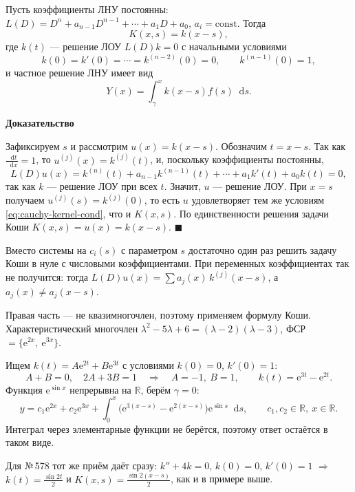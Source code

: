 \documentclass[12pt,a4paper]{article}
\numberwithin{equation}{section}
\newcommand{\R}{\mathbb{R}}
\newcommand{\e}{\mathrm{e}}
\newcommand{\dd}{\mathop{}\!\mathrm{d}}
\renewenvironment{proof}[1][Доказательство]{\begin{center}\textbf{#1}\end{center}}{\hfill$\blacksquare$\par}
\begin{document}
\begin{theoremHSE}
Пусть коэффициенты ЛНУ постоянны: \(L(D)=D^n+a_{n-1}D^{n-1}+\cdots+a_1D+a_0\), \(a_i=\mathrm{const}\). Тогда
\[
K(x,s)=k(x-s),
\]
где \(k(t)\) --- решение ЛОУ \(L(D)k=0\) с начальными условиями
\[
k(0)=k'(0)=\cdots=k^{(n-2)}(0)=0,\qquad k^{(n-1)}(0)=1,
\]
и частное решение ЛНУ имеет вид
\[
Y(x)=\int_\gamma^x k(x-s)f(s)\dd s.
\]
\end{theoremHSE}

\begin{proof}
Зафиксируем \(s\) и рассмотрим \(u(x)=k(x-s)\). Обозначим \(t=x-s\). Так как \(\frac{\dd t}{\dd x}=1\), то \(u^{(j)}(x)=k^{(j)}(t)\), и, поскольку коэффициенты постоянны,
\[
L(D)u(x)=k^{(n)}(t)+a_{n-1}k^{(n-1)}(t)+\cdots+a_1k'(t)+a_0k(t)=0,
\]
так как \(k\) --- решение ЛОУ при всех \(t\). Значит, \(u\) --- решение ЛОУ. При \(x=s\) получаем \(u^{(j)}(s)=k^{(j)}(0)\), то есть \(u\) удовлетворяет тем же условиям \eqref{eq:cauchy-kernel-cond}, что и \(K(x,s)\). По единственности решения задачи Коши \(K(x,s)=u(x)=k(x-s)\).
\end{proof}

\begin{remarkHSE}
Вместо системы на \(c_i(s)\) с параметром \(s\) достаточно один раз решить задачу Коши в нуле с числовыми коэффициентами. При переменных коэффициентах так не получится: тогда \(L(D)u(x)=\sum a_j(x)\,k^{(j)}(x-s)\), а \(a_j(x)\neq a_j(x-s)\).
\end{remarkHSE}

\begin{exampleHSE}[\(y''-5y'+6y=\e^{\sin x}\)]
Правая часть --- не квазимногочлен, поэтому применяем формулу Коши. Характеристический многочлен \(\lambda^2-5\lambda+6=(\lambda-2)(\lambda-3)\), ФСР \(=\{\e^{2x},\ \e^{3x}\}\).

Ищем \(k(t)=A\e^{2t}+B\e^{3t}\) с условиями \(k(0)=0\), \(k'(0)=1\):
\[
A+B=0,\quad 2A+3B=1\quad\Longrightarrow\quad A=-1,\ B=1,\qquad k(t)=\e^{3t}-\e^{2t}.
\]
Функция \(\e^{\sin x}\) непрерывна на \(\R\), берём \(\gamma=0\):
\[
y=c_1\e^{2x}+c_2\e^{3x}+\int_0^x\bigl(\e^{3(x-s)}-\e^{2(x-s)}\bigr)\e^{\sin s}\dd s,\qquad c_1,c_2\in\R,\ x\in\R.
\]
Интеграл через элементарные функции не берётся, поэтому ответ остаётся в таком виде.

Для №\,578 тот же приём даёт сразу: \(k''+4k=0\), \(k(0)=0\), \(k'(0)=1\) \(\Rightarrow\) \(k(t)=\frac{\sin2t}{2}\) и \(K(x,s)=\frac{\sin2(x-s)}{2}\), как и в примере выше.
\end{exampleHSE}
\end{document}
